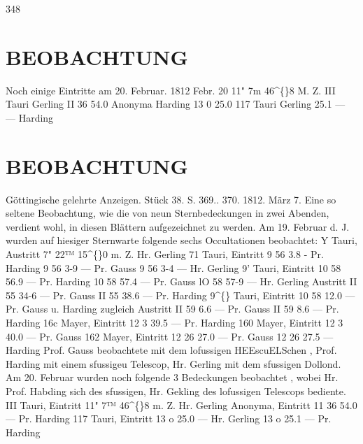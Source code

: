\documentclass[12pt,a4paper]{article}
\begin{document}
\newpage
348 

\section*{BEOBACHTUNG}
Noch  einige  Eintritte  am  20.  Februar. 
1812  Febr.  20 
11"    7m  46\textasciicircum\{\}8  M.  Z.     III  Tauri 
Gerling 
II     36    54.0                Anonyma 
Harding 
13      0    25.0               117  Tauri 
Gerling 
25.1                 ---       --- 
Harding 

\section*{BEOBACHTUNG}
Göttingische  gelehrte  Anzeigen.     Stück  38.     S.  369.. 370.     1812.  März  7. 
Eine  so  seltene  Beobachtung,  wie  die  von  neun  Sternbedeckungen  in  zwei  Abenden,  verdient  wohl, 
in  diesen  Blättern  aufgezeichnet  zu  werden. 
Am  19.  Februar  d.  J.  wurden  auf  hiesiger  Sternwarte  folgende  sechs  Occultationen  beobachtet: 
Y  Tauri,  Austritt    7"  22™  15\textasciicircum\{\}0  m.  Z.   Hr.  Gerling 
71  Tauri, Eintritt 
9 
56 
3.8     - 
Pr.  Harding 
9 
56 
3-9     --- 
Pr.  Gauss 
9 
56 
3-4     --- 
Hr.  Gerling 
9'  Tauri, 
Eintritt 
10 
58 
56.9     --- 
Pr.  Harding 
10 
58 
57.4     --- 
Pr.  Gauss 
lO 
58 
57-9     --- 
Hr.  Gerling 
Austritt 
II 
55 
34-6     --- 
Pr.  Gauss 
II 
55 
38.6     --- 
Pr.  Harding 
9\textasciicircum\{\}  Tauri, 
Eintritt 
10 
58 
12.0     --- 
Pr.  Gauss  u.  Harding  zugleich 
Austritt 
II 
59 
6.6     --- 
Pr.  Gauss 
II 
59 
8.6     --- 
Pr.  Harding 
16c  Mayer, Eintritt 
12 
3 
39.5     --- 
Pr.  Harding 
160  Mayer, Eintritt 12 
3 
40.0     --- 
Pr.  Gauss 
162  Mayer, Eintritt 12 
26 
27.0     --- 
Pr.  Gauss 
12 
26 
27.5     --- 
Harding 
Prof.  Gauss  beobachtete  mit  dem  lofussigen  HEEscuELSchen ,  Prof.  Harding  mit  einem  sfussigeu 
Telescop,  Hr.  Gerling  mit  dem  sfussigen  Dollond. 
Am  20.  Februar  wurden  noch  folgende  3  Bedeckungen  beobachtet ,  wobei  Hr.  Prof.  Habding  sich 
des  sfussigen,  Hr.  Gekling  des  lofussigen  Telescops  bediente. 
III  Tauri,  Eintritt  11"    7™  46\textasciicircum\{\}8  m.  Z.  Hr.  Gerling 
Anonyma,  Eintritt  11  36    54.0     ---  Pr.  Harding 
117  Tauri,  Eintritt  13      o    25.0     ---  Hr.  Gerling 
13      o     25.1     ---  Pr.  Harding 


\newpage
\end{document}
